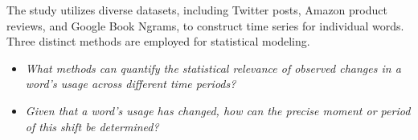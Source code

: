 The study utilizes diverse datasets, including Twitter posts, Amazon product reviews, and Google Book Ngrams, to construct time series for individual words.
Three distinct methods are employed for statistical modeling.

\begin{itemize}
    \item {} \emph{What methods can quantify the statistical relevance of observed changes in a word's usage across different time periods?}
    \item {} \emph{Given that a word's usage has changed, how can the precise moment or period of this shift be determined?}
\end{itemize}



